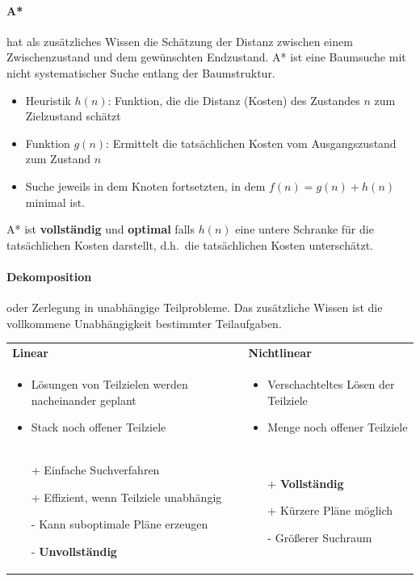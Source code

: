 \paragraph*{A*}
hat als zusätzliches Wissen die Schätzung der Distanz zwischen einem Zwischenzustand und dem gewünschten Endzustand.
A* ist eine Baumsuche mit nicht systematischer Suche entlang der Baumstruktur.
\begin{itemize}
	\item Heuristik $h(n)$: Funktion, die die Distanz (Kosten) des Zustandes $n$ zum Zielzustand schätzt
	\item Funktion $g(n)$: Ermittelt die tatsächlichen Kosten vom Ausgangszustand zum Zustand $n$
	\item Suche jeweils in dem Knoten fortsetzten, in dem $f(n) = g(n) + h(n)$ minimal ist.
\end{itemize}
A* ist \textbf{vollständig} und \textbf{optimal} falls $h(n)$ eine untere Schranke für die tatsächlichen Kosten darstellt, d.h.\ die tatsächlichen Kosten unterschätzt.

\paragraph*{Dekomposition} oder Zerlegung in unabhängige Teilprobleme.
Das zusätzliche Wissen ist die vollkommene Unabhängigkeit bestimmter Teilaufgaben.
\vspace{1em} \\
\begin{tabular}{p{} p{}}
\textbf{Linear} & \textbf{Nichtlinear} \\
\begin{itemize}
	\item Lösungen von Teilzielen werden nacheinander geplant
	\item Stack noch offener Teilziele
\end{itemize}
&
\begin{itemize}
	\item Verschachteltes Lösen der Teilziele
	\item Menge noch offener Teilziele
\end{itemize}
\\
\begin{itemize}
	\item[+] Einfache Suchverfahren
	\item[+] Effizient, wenn Teilziele unabhängig
	\item[-] Kann suboptimale Pläne erzeugen
	\item[-] \textbf{Unvollständig}
\end{itemize}
&
\begin{itemize}
	\item[+] \textbf{Vollständig}
	\item[+] Kürzere Pläne möglich
	\item[-] Größerer Suchraum
\end{itemize}
\end{tabular}


